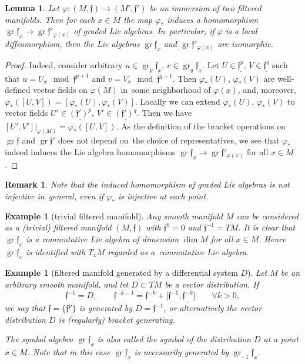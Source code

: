 \documentclass[pdftex]{sigma}%
\newcommand{\f}{\mathfrak f}
\newcommand{\gr}{\operatorname{gr}}
\newtheorem{lem}[thm]{Lemma}
\newtheorem{ex}[thm]{Example}
\newtheorem{rem}[thm]{Remark}}
\numberwithin{equation}{section}
\begin{document}
\begin{lem}
	Let $\varphi\colon (M,\f)\to (M',\f')$ be an immersion of two filtered manifolds. Then for each $x\in M$ the map $\varphi_*$ induces a homomorphism $\gr\f_x \to \gr\f'_{\varphi(x)}$ of graded Lie algebras. In~par\-ti\-cu\-lar, if $\varphi$ is a local diffeomorphism, then the Lie algebras $\gr\f_x$ and $\gr\f'_{\varphi(x)}$ are isomorphic.
\end{lem}
\begin{proof}
	Indeed, consider arbitrary $u\in \gr_p\f_x$, $v\in \gr_q\f_x$. Let $U\in \underline{\f^p}$, $V\in\underline {\f^q}$ such that $u=U_x\mod\f^{p+1}$ and $v=V_x\mod\f^{q+1}$.
Then $\varphi_*(U)$, $\varphi_*(V)$ are well-defined vector fields on $\varphi(M)$ in~some neighborhood of $\varphi(x)$, and, moreover, $\varphi_*([U,V])=[\varphi_*(U),\varphi_*(V)]$. Locally we can extend $\varphi_*(U)$, $\varphi_*(V)$ to vector fields $U'\in\underline{(\f')^p}$, $V'\in\underline{(\f')^q}$. Then we have $[U',V']|_{\varphi(M)} = \varphi_*([U,V])$. As the definition of the bracket operations on $\gr\f$ and $\gr\f'$ does not depend on~the choice of representatives,
we see that $\varphi_*$ indeed induces the Lie algebra homomorphisms
$\gr\f_x\to \gr\f'_{\varphi(x)}$ for all $x\in M$.
\end{proof}
\begin{rem}
	Note that the induced homomorphism of graded Lie algebras is not injective in~general, even if $\varphi_*$ is injective at each point.
\end{rem}

\begin{ex} [trivial filtered manifold] Any smooth manifold $M$ can be considered as a (trivial) filtered manifold $(M,\f)$ with $\f^0=0$ and $\f^{-1} = TM$. It is clear that
	$\gr\f_x$ is a commutative Lie algebra of dimension $\dim M$ for all $x\in M$. Hence $\gr\f_x$ is identified with $T_x M$ regarded as a~commutative Lie algebra.
\end{ex}

\begin{ex} [filtered manifold generated by a differential system $D$]
Let $M$ be an arbitrary smooth manifold, and let $D\subset TM$ be a vector distribution.
If
\[
\f^{-1}=D,\qquad
\underline{\f^{-k-1}}=\underline{\f^{-k}}+\big[\underline{\f^{-1}},\underline{\f^{-k}}\big]\qquad
\forall k>0,
\]
we say that $\f=\{ \f^p\}$ is generated by $D=\f^{-1}$,
or alternatively the vector distribution $D$ is (regularly) bracket generating.

The symbol algebra $\gr \f_x$ is also called the symbol of the distribution $D$ at a point $x\in M$. Note that in this case $\gr \f_x$ is necessarily generated by $\gr_{-1}\f_x$.
\end{ex}
\end{document}
